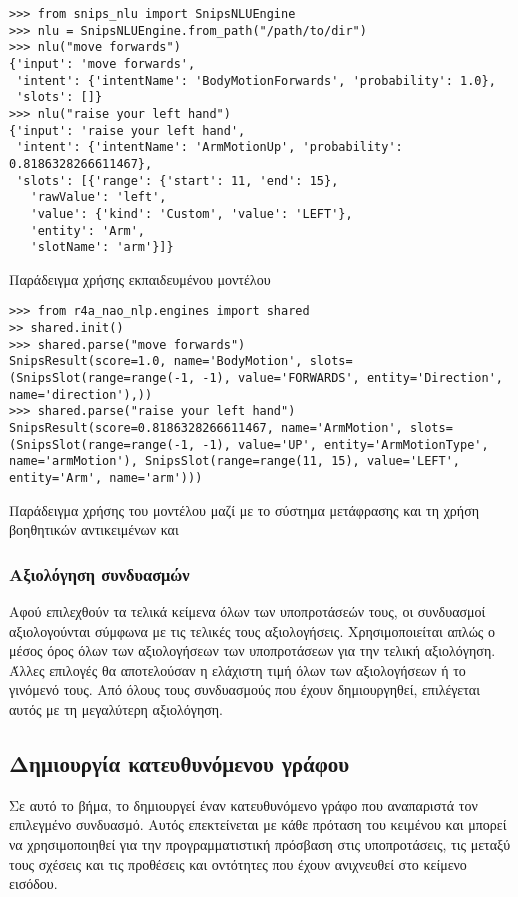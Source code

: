 \begin{code}
    \begin{verbatim}
>>> from snips_nlu import SnipsNLUEngine
>>> nlu = SnipsNLUEngine.from_path("/path/to/dir")
>>> nlu("move forwards")
{'input': 'move forwards',
 'intent': {'intentName': 'BodyMotionForwards', 'probability': 1.0},
 'slots': []}
>>> nlu("raise your left hand")
{'input': 'raise your left hand',
 'intent': {'intentName': 'ArmMotionUp', 'probability': 0.8186328266611467},
 'slots': [{'range': {'start': 11, 'end': 15},
   'rawValue': 'left',
   'value': {'kind': 'Custom', 'value': 'LEFT'},
   'entity': 'Arm',
   'slotName': 'arm'}]}
    \end{verbatim}
    \caption{Παράδειγμα χρήσης εκπαιδευμένου μοντέλου }

    \begin{verbatim}
>>> from r4a_nao_nlp.engines import shared
>> shared.init()
>>> shared.parse("move forwards")
SnipsResult(score=1.0, name='BodyMotion', slots=(SnipsSlot(range=range(-1, -1), value='FORWARDS', entity='Direction', name='direction'),))
>>> shared.parse("raise your left hand")
SnipsResult(score=0.8186328266611467, name='ArmMotion', slots=(SnipsSlot(range=range(-1, -1), value='UP', entity='ArmMotionType', name='armMotion'), SnipsSlot(range=range(11, 15), value='LEFT', entity='Arm', name='arm')))
    \end{verbatim}
    \caption{Παράδειγμα χρήσης του μοντέλου μαζί με το σύστημα μετάφρασης και τη χρήση βοηθητικών αντικειμένων  και }
\end{code}

\subsubsection{Αξιολόγηση συνδυασμών}\label{subsec:4-score}
Αφού επιλεχθούν τα τελικά κείμενα όλων των υποπροτάσεών τους, οι συνδυασμοί αξιολογούνται σύμφωνα με τις τελικές τους αξιολογήσεις.
Χρησιμοποιείται απλώς ο μέσος όρος όλων των αξιολογήσεων των υποπροτάσεων για την τελική αξιολόγηση.
Άλλες επιλογές θα αποτελούσαν η ελάχιστη τιμή όλων των αξιολογήσεων ή το γινόμενό τους.
Από όλους τους συνδυασμούς που έχουν δημιουργηθεί, επιλέγεται αυτός με τη μεγαλύτερη αξιολόγηση.

\subsection{Δημιουργία κατευθυνόμενου γράφου}\label{subsec:4-DiGraph}
Σε αυτό το βήμα, το \projectname{} δημιουργεί έναν κατευθυνόμενο γράφο που αναπαριστά τον επιλεγμένο συνδυασμό.
Αυτός επεκτείνεται με κάθε πρόταση του κειμένου και μπορεί να χρησιμοποιηθεί για την προγραμματιστική πρόσβαση στις υποπροτάσεις, τις μεταξύ τους σχέσεις και τις προθέσεις και οντότητες που έχουν ανιχνευθεί στο κείμενο εισόδου.

